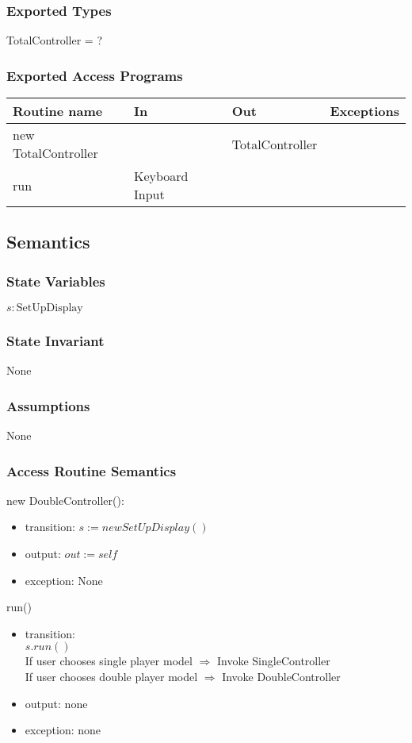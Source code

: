 \documentclass[12pt]{article}
\begin{document}
\subsubsection*{Exported Types}
TotalController = ?
\subsubsection*{Exported Access Programs}
\begin{tabular}{| l | l | l | p{5cm} |}
\hline
\textbf{Routine name} & \textbf{In} & \textbf{Out} & \textbf{Exceptions}\\
\hline
new TotalController &  & TotalController & \\
\hline
run & Keyboard Input &  & \\
\hline
\end{tabular}

\subsection*{Semantics}
\subsubsection*{State Variables}
$s : \text{SetUpDisplay}$
\subsubsection*{State Invariant}
None
\subsubsection*{Assumptions}
None
\subsubsection*{Access Routine Semantics}
\noindent new DoubleController():
\begin{itemize}
\item transition: $s := new SetUpDisplay()$
\item output: $out := \mathit{self}$
\item exception: None
\end{itemize}

\noindent run()
\begin{itemize}
\item transition:\\
$s.run()$\\
If user chooses single player model $\Rightarrow$ Invoke SingleController\\
If user chooses double player model $\Rightarrow$ Invoke DoubleController\\
\item output: none
\item exception: none
\end{itemize}
\newpage
\end{document}
